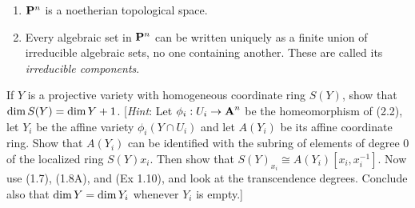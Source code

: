 \documentclass[10pt]{amsart}
\begin{document}
\begin{solution}

\end{solution}

\begin{exercise}[Exercise 2.5]
    \begin{enumerate}
        \item $\bbP^n$ is a noetherian topological space. 
        \item Every algebraic set in $\bbP^n$ can be written uniquely as a finite
          union of irreducible algebraic sets, no one containing another. These are
          called its \emph{irreducible components}. 
    \end{enumerate}
\end{exercise}

\begin{solution}

\end{solution}

\begin{exercise}[2.6]
    If $Y$ is a projective variety with homogeneous coordinate ring $S(Y)$, show that $\Dim S(Y) = \Dim Y + 1$. 
    [\emph{Hint}: Let $\phi_i: U_i \to \aa^n$ be the homeomorphism of (2.2), 
    let $Y_i$ be the affine variety $\phi_i(Y \cap U_i)$ and let $A(Y_i)$ be its affine coordinate ring.
    Show that $A(Y_i)$ can be identified with the subring of elements of degree 0 of the 
    localized ring $S(Y)x_i$. Then show that $S(Y)_{x_i} \cong A(Y_i)[x_i, x_i^{-1}]$. 
    Now use (1.7), (1.8A), and (Ex 1.10), and look at the transcendence degrees. Conclude also that 
    $\Dim Y = \Dim Y_i$ whenever $Y_i$ is empty.]
\end{exercise}
\end{document}
